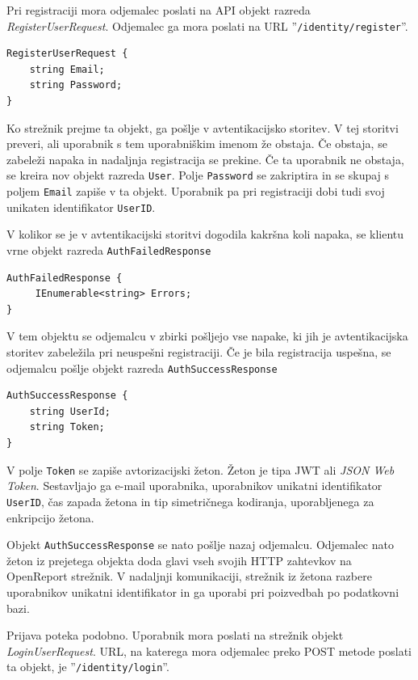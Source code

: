 \documentclass[a4paper, 12pt]{book}
\begin{document}
Pri registraciji mora odjemalec poslati na API objekt razreda \textit{RegisterUserRequest}.
Odjemalec ga mora poslati na URL ''\texttt{/identity/register}''.

\begin{verbatim}
RegisterUserRequest {
    string Email; 
    string Password; 
} 
\end{verbatim}


Ko strežnik prejme ta objekt, ga pošlje v avtentikacijsko storitev.
V tej storitvi preveri, ali uporabnik s tem uporabniškim imenom že obstaja.
Če obstaja, se zabeleži napaka in nadaljnja registracija se prekine.
Če ta uporabnik ne obstaja, se kreira nov objekt razreda \texttt{User}.
Polje \texttt{Password} se zakriptira in se skupaj s poljem \texttt{Email} zapiše v ta objekt.
Uporabnik pa pri registraciji dobi tudi svoj unikaten identifikator \texttt{UserID}.

V kolikor se je v avtentikacijski storitvi dogodila kakršna koli napaka, se klientu vrne objekt razreda \texttt{AuthFailedResponse}

\begin{verbatim}
AuthFailedResponse { 
     IEnumerable<string> Errors; 
}
\end{verbatim}

\noindent V tem objektu se odjemalcu v zbirki pošljejo vse napake, ki jih je avtentikacijska storitev zabeležila pri neuspešni registraciji. 
Če je bila registracija uspešna, se odjemalcu pošlje objekt razreda \texttt{AuthSuccessResponse}

\begin{verbatim}
AuthSuccessResponse { 
    string UserId; 
    string Token; 
} 
\end{verbatim}

\noindent V polje \texttt{Token} se zapiše avtorizacijski žeton.
Žeton je tipa JWT ali \textit{JSON Web Token}.
Sestavljajo ga e-mail uporabnika, uporabnikov unikatni identifikator \texttt{UserID}, čas zapada žetona in tip simetričnega kodiranja, uporabljenega za enkripcijo žetona.

Objekt \texttt{AuthSuccessResponse} se nato pošlje nazaj odjemalcu.
Odjemalec nato žeton iz prejetega objekta doda glavi vseh svojih HTTP zahtevkov na OpenReport strežnik.
V nadaljnji komunikaciji, strežnik iz žetona razbere uporabnikov unikatni identifikator in ga uporabi pri poizvedbah po podatkovni bazi.

Prijava poteka podobno.
Uporabnik mora poslati na strežnik objekt \textit{LoginUserRequest}.
URL, na katerega mora odjemalec preko POST metode poslati ta objekt, je ''\texttt{/identity/login}''.
\end{document}
